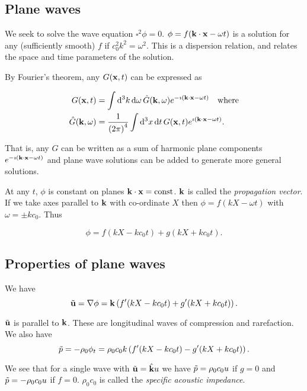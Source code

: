 \documentclass{notes}
\newcommand{\vk}{\vect{k}}
\renewcommand{\Box}{\square}
\begin{document}
\subsection{Plane waves}

We seek to solve the wave equation $\Box^2 \phi = 0$.  $\phi
= f(\vk \cdot \vx - \omega t)$ is a solution for any (sufficiently smooth)
$f$ if $c_0^2 k^2 = \omega^2$.  This is a dispersion relation, and relates
the space and time parameters of the solution.

By Fourier's theorem, any $G(\mathbf{x},t)$ can be expressed as

\begin{align*}
G(\vx,t) &= \int \ud^3 k\, \ud \omega\, \Hat{G}(\vk,\omega) e^{-\imath
( \vk \cdot \vx - \omega t)} \quad \text{where} \\
\Hat{G}(\vk,\omega) &= \frac{1}{\left(2 \pi\right)^4} \int \ud^3 x\, \ud t\,
G(\vx,t) e^{\imath( \vk \cdot \vx - \omega t)}.
\end{align*}

That is, any $G$ can be written as a sum of harmonic plane
components $e^{-\imath( \vk \cdot \vx - \omega t)}$ and plane wave solutions
can be added to generate more general solutions.

At any $t$, $\phi$ is constant on planes $\vk \cdot \vx = \text{const}$.
$\vk$ is called the \emph{propagation vector}.  If we take axes parallel
to $\vk$ with co-ordinate $X$ then $\phi = f(k X - \omega t)$ with
$\omega = \pm k c_0$.  Thus

\begin{equation}\label{eq:planewave}
\phi = f(k X - k c_0 t) + g(k X + k c_0 t).
\end{equation}

\vspace{1in}

\subsection{Properties of plane waves}

We have
\[
\Tilde{\vu} = \nabla \phi = \vk \left( f'(k X - k c_0 t) +
g'(k X + k c_0 t) \right).
\]

$\Tilde{\mathbf{u}}$ is parallel to $\vk$.  These are longitudinal waves of
compression and rarefaction.  We also have
\[
\Tilde{p} = - \rho_0 \phi_t = \rho_0 c_0 k \left(
f'(k X - k c_0 t) - g'(k X + k c_0 t) \right).
\]

We see that for a single wave with $\Tilde{\vu} = \Hat{\vk} u$
we have $\Tilde{p} = \rho_0 c_0 u$ if $g = 0$ and $\Tilde{p}
= - \rho_0 c_0 u$ if $f=0$.  $\rho_0 c_0$ is called the \emph{specific
acoustic impedance}.
\end{document}
